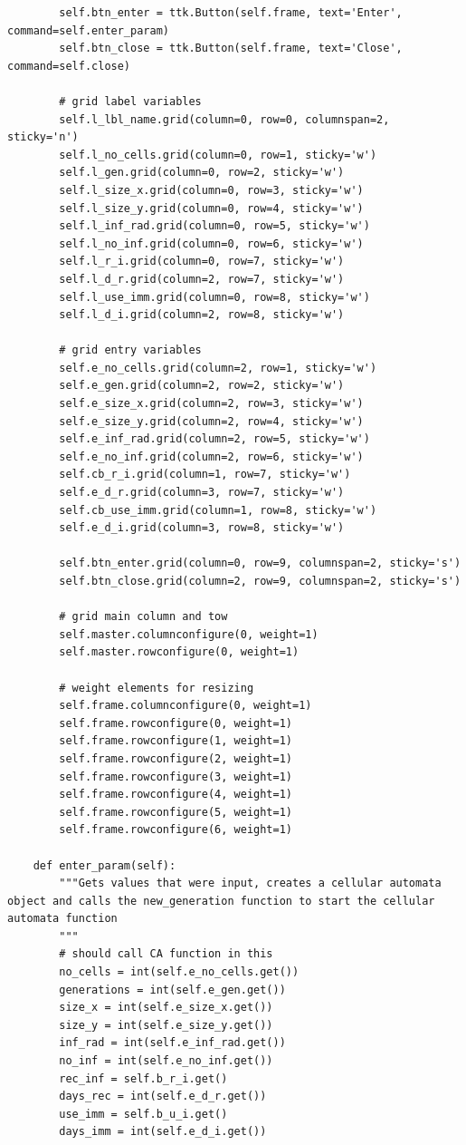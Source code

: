 \documentclass[11pt, a4paper]{article}
\begin{document}
\begin{lstlisting}
        self.btn_enter = ttk.Button(self.frame, text='Enter', command=self.enter_param)
        self.btn_close = ttk.Button(self.frame, text='Close', command=self.close)

        # grid label variables
        self.l_lbl_name.grid(column=0, row=0, columnspan=2, sticky='n')
        self.l_no_cells.grid(column=0, row=1, sticky='w')
        self.l_gen.grid(column=0, row=2, sticky='w')
        self.l_size_x.grid(column=0, row=3, sticky='w')
        self.l_size_y.grid(column=0, row=4, sticky='w')
        self.l_inf_rad.grid(column=0, row=5, sticky='w')
        self.l_no_inf.grid(column=0, row=6, sticky='w')
        self.l_r_i.grid(column=0, row=7, sticky='w')
        self.l_d_r.grid(column=2, row=7, sticky='w')
        self.l_use_imm.grid(column=0, row=8, sticky='w')
        self.l_d_i.grid(column=2, row=8, sticky='w')

        # grid entry variables
        self.e_no_cells.grid(column=2, row=1, sticky='w')
        self.e_gen.grid(column=2, row=2, sticky='w')
        self.e_size_x.grid(column=2, row=3, sticky='w')
        self.e_size_y.grid(column=2, row=4, sticky='w')
        self.e_inf_rad.grid(column=2, row=5, sticky='w')
        self.e_no_inf.grid(column=2, row=6, sticky='w')
        self.cb_r_i.grid(column=1, row=7, sticky='w')
        self.e_d_r.grid(column=3, row=7, sticky='w')
        self.cb_use_imm.grid(column=1, row=8, sticky='w')
        self.e_d_i.grid(column=3, row=8, sticky='w')

        self.btn_enter.grid(column=0, row=9, columnspan=2, sticky='s')
        self.btn_close.grid(column=2, row=9, columnspan=2, sticky='s')

        # grid main column and tow
        self.master.columnconfigure(0, weight=1)
        self.master.rowconfigure(0, weight=1)

        # weight elements for resizing
        self.frame.columnconfigure(0, weight=1)
        self.frame.rowconfigure(0, weight=1)
        self.frame.rowconfigure(1, weight=1)
        self.frame.rowconfigure(2, weight=1)
        self.frame.rowconfigure(3, weight=1)
        self.frame.rowconfigure(4, weight=1)
        self.frame.rowconfigure(5, weight=1)
        self.frame.rowconfigure(6, weight=1)

    def enter_param(self):
        """Gets values that were input, creates a cellular automata object and calls the new_generation function to start the cellular automata function
        """
        # should call CA function in this
        no_cells = int(self.e_no_cells.get())
        generations = int(self.e_gen.get())
        size_x = int(self.e_size_x.get())
        size_y = int(self.e_size_y.get())
        inf_rad = int(self.e_inf_rad.get())
        no_inf = int(self.e_no_inf.get())
        rec_inf = self.b_r_i.get()
        days_rec = int(self.e_d_r.get())
        use_imm = self.b_u_i.get()
        days_imm = int(self.e_d_i.get())


\end{lstlisting}
\end{document}
